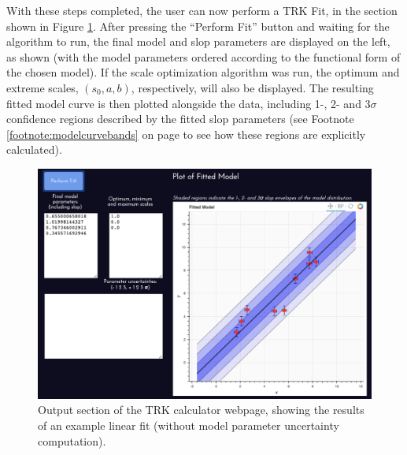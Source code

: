 With these steps completed, the user can now perform a TRK Fit, in the section shown in Figure \ref{fig:websiteoutput}. After pressing the ``Perform Fit'' button and waiting for the algorithm to run, the final model and slop parameters are displayed on the left, as shown (with the model parameters ordered according to the functional form of the chosen model). If the scale optimization algorithm was run, the optimum and extreme scales, $(s_0,a,b)$, respectively, will also be displayed. The resulting fitted model curve is then plotted alongside the data, including 1-, 2- and $3\sigma$ confidence regions described by the fitted slop parameters (see Footnote \ref{footnote:modelcurvebands} on page \pageref{footnote:modelcurvebands} to see how these regions are explicitly calculated).
\begin{figure}
    \centering
    \includegraphics[width=1.0\linewidth]{figures/websiteoutput.png}
    \caption{Output section of the TRK calculator webpage, showing the results of an example linear fit (without model parameter uncertainty computation).}
    \label{fig:websiteoutput}
\end{figure}